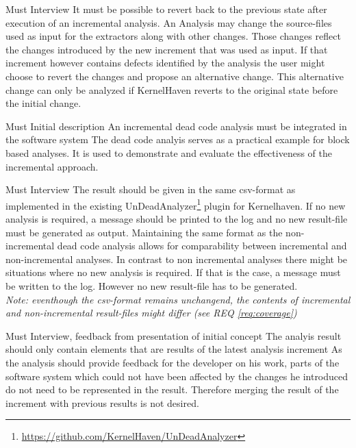 \documentclass[a4paper]{article}
\begin{document}
\begin{req} \label{req:rollback}
\reqtable
	{Must}  {Interview}
	{It must be possible to revert back to the previous state after execution of an incremental analysis.}
	{An Analysis may change the source-files used as input for the extractors along with other changes. Those changes reflect the changes introduced by the new increment that was used as input. If that increment however contains defects identified by the analysis the user might choose to revert the changes and propose an alternative change. This alternative change can only be analyzed if KernelHaven reverts to the original state before the initial change.}

\end{req}

\begin{req} 
\reqtable
	{Must}  {Initial description}
	{An incremental dead code analysis must be integrated in the software system}
	{The dead code analyis serves as a practical example for block based analyses. It is used to demonstrate and evaluate the effectiveness of the incremental approach.}
	
	

	
	\begin{subreq} \label{req:format}
    \reqtable
    {Must}  {Interview}
	{The result should be given in the same csv-format as implemented in the existing UnDeadAnalyzer\footnote{\url{https://github.com/KernelHaven/UnDeadAnalyzer}} plugin for Kernelhaven. If no new analysis is required, a message should be printed to the log and no new result-file must be generated as output.}
	{Maintaining the same format as the non-incremental dead code analysis allows for comparability between incremental and non-incremental analyses. In contrast to non incremental analyses there might be situations where no new analysis is required. If that is the case, a message must be written to the log. However no new result-file has to be generated. \\
	\emph{Note: eventhough the csv-format remains unchangend, the contents of incremental and non-incremental result-files might differ (see REQ \ref{req:coverage})}}
	\end{subreq}
	
	\begin{subreq} \label{req:coverage}
    \reqtable
    {Must}  {Interview, feedback from presentation of initial concept}
	{The analyis result should only contain elements that are results of the latest analysis increment}
	{As the analysis should provide feedback for the developer on his work, parts of the software system which could not have been affected by the changes he introduced do not need to be represented in the result. Therefore merging the result of the increment with previous results is not desired.}
	\end{subreq}
\end{req}
\end{document}
